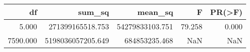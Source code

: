 \begin{tabular}{rrrrr}
\toprule
df & sum\_sq & mean\_sq & F & PR(>F) \\
\midrule
5.000 & 271399165518.753 & 54279833103.751 & 79.258 & 0.000 \\
7590.000 & 5198036057205.649 & 684853235.468 & NaN & NaN \\
\bottomrule
\end{tabular}
